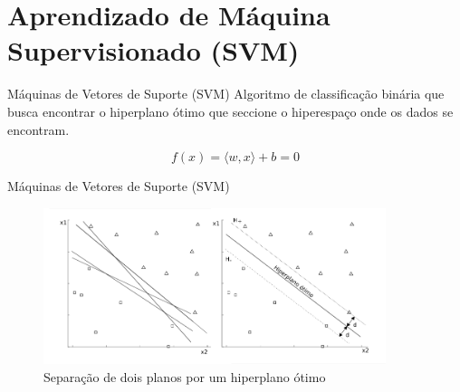 \documentclass[10pt]{beamer}
\begin{document}
\section*{Aprendizado de Máquina Supervisionado (SVM)}
\begin{frame}{Máquinas de Vetores de Suporte (SVM)}
  Algoritmo de classificação binária que busca encontrar o hiperplano 
  ótimo que seccione o hiperespaço onde os dados se encontram.

  \begin{equation}
    f(x) = \langle w, x \rangle + b = 0
    \nonumber
  \end{equation}
\end{frame}

\begin{frame}{Máquinas de Vetores de Suporte (SVM)}
  \begin{figure}[]
    \centering
    \includegraphics[width=10cm]{images/svmSample.png}
    \caption{Separação de dois planos por um hiperplano ótimo}
    \label{fig:svm}
  \end{figure}
\end{frame}


\end{document}
